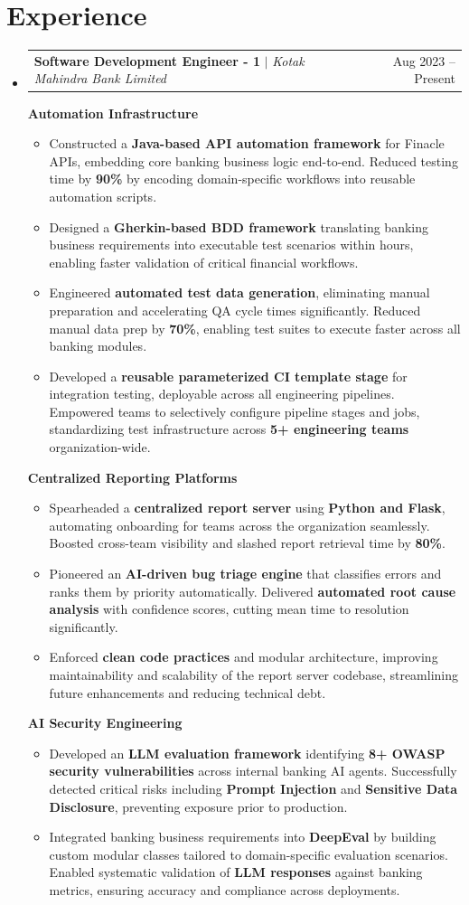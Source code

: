 \documentclass[a4paper,10pt]{article}
\makeatletter
\newcommand{\resumeItem}[1]{
  \item\small{
    {#1 \vspace{-1.8pt}}
  }
}
\newcommand{\resumeEntryHeading}[3]{
  \vspace{2pt}\item
    \begin{tabular*}{0.98\textwidth}[t]{l@{\extracolsep{\fill}}r}
      \textbf{#1} $|$ \textit{#2} & \small #3 \\
    \end{tabular*}\vspace{-3pt}
}
\newcommand{\resumeSubHeadingListStart}{
  \begin{itemize}[leftmargin=0.15in, label={}, topsep=2pt, partopsep=0pt, itemsep=4pt, parsep=0pt]
}
\newcommand{\resumeSubHeadingListEnd}{\end{itemize}}
\newcommand{\resumeItemListStart}{\begin{itemize}[topsep=2pt, partopsep=0pt, itemsep=1.5pt, parsep=0pt]}
\newcommand{\resumeItemListEnd}{\end{itemize}\vspace{-2pt}}
\makeatother
\begin{document}
\section{Experience}
\resumeSubHeadingListStart
  \resumeEntryHeading{Software Development Engineer - 1}{Kotak Mahindra Bank Limited}{Aug 2023 -- Present}
  \vspace{2pt}
  \textbf{Automation Infrastructure}
  \resumeItemListStart
    \resumeItem{Constructed a \textbf{Java-based API automation framework} for Finacle APIs, embedding core banking business logic end-to-end. Reduced testing time by \textbf{90\%} by encoding domain-specific workflows into reusable automation scripts.}
    \resumeItem{Designed a \textbf{Gherkin-based BDD framework} translating banking business requirements into executable test scenarios within hours, enabling faster validation of critical financial workflows.}
    \resumeItem{Engineered \textbf{automated test data generation}, eliminating manual preparation and accelerating QA cycle times significantly. Reduced manual data prep by \textbf{70\%}, enabling test suites to execute faster across all banking modules.}
    \resumeItem{Developed a \textbf{reusable parameterized CI template stage} for integration testing, deployable across all engineering pipelines. Empowered teams to selectively configure pipeline stages and jobs, standardizing test infrastructure across \textbf{5+ engineering teams} organization-wide.}
  \resumeItemListEnd
  \vspace{2pt}
  \textbf{Centralized Reporting Platforms}
  \resumeItemListStart
    \resumeItem{Spearheaded a \textbf{centralized report server} using \textbf{Python and Flask}, automating onboarding for teams across the organization seamlessly. Boosted cross-team visibility and slashed report retrieval time by \textbf{80\%}.}
    \resumeItem{Pioneered an \textbf{AI-driven bug triage engine} that classifies errors and ranks them by priority automatically. Delivered \textbf{automated root cause analysis} with confidence scores, cutting mean time to resolution significantly.}
    \resumeItem{Enforced \textbf{clean code practices} and modular architecture, improving maintainability and scalability of the report server codebase, streamlining future enhancements and reducing technical debt.}
  \resumeItemListEnd
  \vspace{2pt}
  \textbf{AI Security Engineering}
  \resumeItemListStart
    \resumeItem{Developed an \textbf{LLM evaluation framework} identifying \textbf{8+ OWASP security vulnerabilities} across internal banking AI agents. Successfully detected critical risks including \textbf{Prompt Injection} and \textbf{Sensitive Data Disclosure}, preventing exposure prior to production.}
    \resumeItem{Integrated banking business requirements into \textbf{DeepEval} by building custom modular classes tailored to domain-specific evaluation scenarios. Enabled systematic validation of \textbf{LLM responses} against banking metrics, ensuring accuracy and compliance across deployments.}
  \resumeItemListEnd
\resumeSubHeadingListEnd
\end{document}

